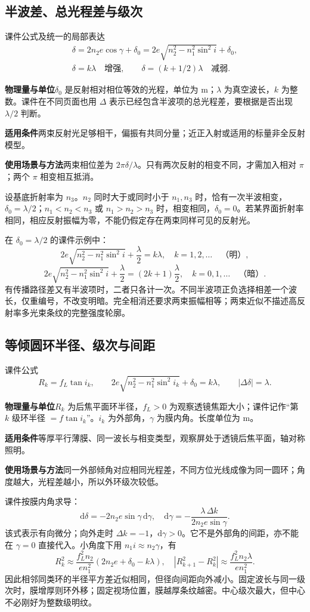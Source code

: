 \documentclass[UTF8,fontset=none,zihao=-4,a4paper]{ctexart}
\newcommand{\explain}[3]{\par\noindent\textbf{物理量与单位}\quad #1\par
\noindent\textbf{适用条件}\quad #2\par
\noindent\textbf{使用场景与方法}\quad #3\par}
\begin{document}
\subsection{半波差、总光程差与级次}
\begin{infobox}[breakable=false]{课件公式及统一的局部表达}
\begin{gather*}
 \delta=2n_2e\cos\gamma+\delta_0
 =2e\sqrt{n_2^2-n_1^2\sin^2 i}+\delta_0,\\
 \delta=k\lambda\quad\text{增强},\qquad
 \delta=(k+1/2)\lambda\quad\text{减弱}.
\end{gather*}
\end{infobox}
\explain{$\delta_0$ 是反射相对相位等效的光程，单位为 m；$\lambda$ 为真空波长，$k$ 为整数。课件在不同页面也用 $\Delta$ 表示已经包含半波项的总光程差，要根据是否出现 $\lambda/2$ 判断。}{两束反射光足够相干，偏振有共同分量；近正入射或适用的标量非全反射模型。}{两束相位差为 $2\pi\delta/\lambda$。只有两次反射的相变不同，才需加入相对 $\pi$；两个 $\pi$ 相变相互抵消。}
设基底折射率为 $n_3$。$n_2$ 同时大于或同时小于 $n_1,n_3$ 时，恰有一次半波相变，$\delta_0=\lambda/2$；$n_1<n_2<n_3$ 或 $n_1>n_2>n_3$ 时，相变相同，$\delta_0=0$。若某界面折射率相同，相应反射振幅为零，不能仍假定存在两束同样可见的反射光。

在 $\delta_0=\lambda/2$ 的课件示例中：
\[
 2e\sqrt{n_2^2-n_1^2\sin^2i}+\frac\lambda2=k\lambda,
 \quad k=1,2,\ldots\quad\text{（明）},
\]
\[
 2e\sqrt{n_2^2-n_1^2\sin^2i}+\frac\lambda2=(2k+1)\frac\lambda2,
 \quad k=0,1,\ldots\quad\text{（暗）}.
\]
有传播路径差又有半波项时，二者只各计一次。不同半波项正负选择相差一个波长，仅重编号，不改变明暗。完全相消还要求两束振幅相等；两束近似不描述高反射率多光束条纹的完整强度轮廓。

\subsection{等倾圆环半径、级次与间距}
\begin{infobox}[breakable=false]{课件公式}
\[
 R_k=f_L\tan i_k,\qquad
 2e\sqrt{n_2^2-n_1^2\sin^2 i_k}+\delta_0=k\lambda,
 \qquad |\Delta\delta|=\lambda.
\]
\end{infobox}
\explain{$R_k$ 为后焦平面环半径，$f_L>0$ 为观察透镜焦距大小；课件记作“第 $k$ 级环半径 $=f\tan i_k$”。$i_k$ 为外部角，$\gamma$ 为膜内角。长度单位为 m。}{等厚平行薄膜、同一波长与相变类型，观察屏处于透镜后焦平面，轴对称照明。}{同一外部倾角对应相同光程差，不同方位光线成像为同一圆环；角度越大，光程差越小，所以外环级次较低。}
课件按膜内角求导：
\[
 \mathrm d\delta=-2n_2e\sin\gamma\,\mathrm d\gamma,
 \quad \mathrm d\gamma=-\frac{\lambda\,\Delta k}{2n_2e\sin\gamma}.
\]
该式表示有向微分；向外走时 $\Delta k=-1$，$\mathrm d\gamma>0$。它不是外部角的间距，亦不能在 $\gamma=0$ 直接代入。小角度下用 $n_1i\approx n_2\gamma$，有
\[
 R_k^2\approx\frac{f_L^2n_2}{en_1^2}(2n_2e+\delta_0-k\lambda),
 \quad |R_{k+1}^2-R_k^2|\approx\frac{f_L^2n_2\lambda}{en_1^2}.
\]
因此相邻同类环的半径平方差近似相同，但径向间距向外减小。固定波长与同一级次时，膜增厚则环外移；固定视场位置，膜越厚条纹越密。中心级次最大，但中心不必刚好为整数级明纹。
\end{document}
